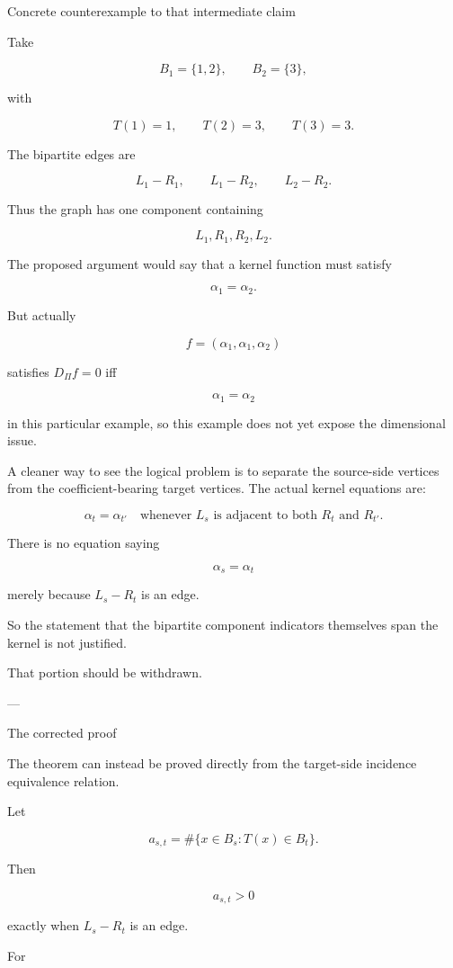 Concrete counterexample to that intermediate claim

Take

\[
B_1=\{1,2\},\qquad B_2=\{3\},  
\]

with

\[
T(1)=1,\qquad T(2)=3,\qquad T(3)=3.  
\]

The bipartite edges are

\[
L_1-R_1,\qquad L_1-R_2,\qquad L_2-R_2.  
\]

Thus the graph has one component containing

\[
L_1,R_1,R_2,L_2.  
\]

The proposed argument would say that a kernel function must satisfy

\[
\alpha_1=\alpha_2.  
\]

But actually

\[
f=(\alpha_1,\alpha_1,\alpha_2)  
\]

satisfies \(D_\Pi f=0\) iff

\[
\alpha_1=\alpha_2  
\]

in this particular example, so this example does not yet expose the dimensional issue.

A cleaner way to see the logical problem is to separate the source-side vertices from the coefficient-bearing target vertices. The actual kernel equations are:

\[
\boxed{  
\alpha_t=\alpha_{t'}  
\quad\text{whenever }L_s\text{ is adjacent to both }R_t\text{ and }R_{t'}.  
}  
\]

There is no equation saying

\[
\alpha_s=\alpha_t  
\]

merely because \(L_s-R_t\) is an edge.

So the statement that the bipartite component indicators themselves span the kernel is not justified.

That portion should be withdrawn.


---

The corrected proof

The theorem can instead be proved directly from the target-side incidence equivalence relation.

Let

\[
a_{s,t}  
=  
\#\{x\in B_s:T(x)\in B_t\}.  
\]

Then

\[
a_{s,t}>0  
\]

exactly when \(L_s-R_t\) is an edge.

For

